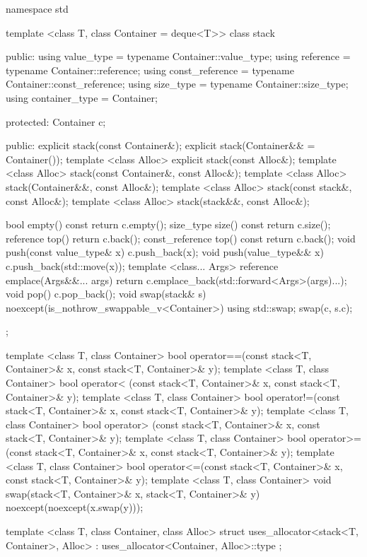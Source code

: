 \begin{codeblock}
namespace std {
  template <class T, class Container = deque<T>>
  class stack {
  public:
    using value_type      = typename Container::value_type;
    using reference       = typename Container::reference;
    using const_reference = typename Container::const_reference;
    using size_type       = typename Container::size_type;
    using container_type  = Container;

  protected:
    Container c;

  public:
    explicit stack(const Container&);
    explicit stack(Container&& = Container());
    template <class Alloc> explicit stack(const Alloc&);
    template <class Alloc> stack(const Container&, const Alloc&);
    template <class Alloc> stack(Container&&, const Alloc&);
    template <class Alloc> stack(const stack&, const Alloc&);
    template <class Alloc> stack(stack&&, const Alloc&);

    bool      empty() const             { return c.empty(); }
    size_type size()  const             { return c.size(); }
    reference         top()             { return c.back(); }
    const_reference   top() const       { return c.back(); }
    void push(const value_type& x)      { c.push_back(x); }
    void push(value_type&& x)           { c.push_back(std::move(x)); }
    template <class... Args>
      reference emplace(Args&&... args) { return c.emplace_back(std::forward<Args>(args)...); }
    void pop()                          { c.pop_back(); }
    void swap(stack& s) noexcept(is_nothrow_swappable_v<Container>)
      { using std::swap; swap(c, s.c); }
  };

  template <class T, class Container>
    bool operator==(const stack<T, Container>& x, const stack<T, Container>& y);
  template <class T, class Container>
    bool operator< (const stack<T, Container>& x, const stack<T, Container>& y);
  template <class T, class Container>
    bool operator!=(const stack<T, Container>& x, const stack<T, Container>& y);
  template <class T, class Container>
    bool operator> (const stack<T, Container>& x, const stack<T, Container>& y);
  template <class T, class Container>
    bool operator>=(const stack<T, Container>& x, const stack<T, Container>& y);
  template <class T, class Container>
    bool operator<=(const stack<T, Container>& x, const stack<T, Container>& y);
  template <class T, class Container>
    void swap(stack<T, Container>& x, stack<T, Container>& y) noexcept(noexcept(x.swap(y)));

  template <class T, class Container, class Alloc>
    struct uses_allocator<stack<T, Container>, Alloc>
      : uses_allocator<Container, Alloc>::type { };
}
\end{codeblock}

